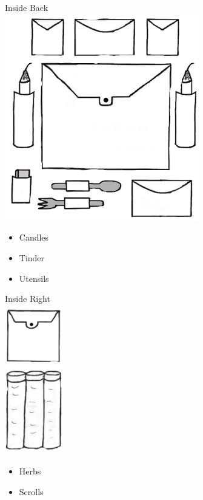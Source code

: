\documentclass[11pt]{article}
\begin{document}
\begin{minipage}[t]{.5\textwidth}
    \normalsize{Inside Back}\\
    \includegraphics[height=9.0cm]{img/CandlesTinder.png}\\
    \begin{normalsize}
        \begin{itemize}[topsep=0pt, itemsep=0pt, partopsep=0pt, parsep=0pt]
            \item Candles
            \item Tinder
            \item Utensils
        \end{itemize}
        \end{normalsize}
\end{minipage}
\begin{minipage}[t]{.248\textwidth}
    \normalsize{Inside Right}\\
    \includegraphics[height=6.5cm]{img/Scrolls-herbs.png}\\
        \begin{itemize}[topsep=0pt, itemsep=0pt, partopsep=0pt, parsep=0pt]
            \item Herbs
            \item Scrolls
        \end{itemize}
\end{minipage}
\end{document}
